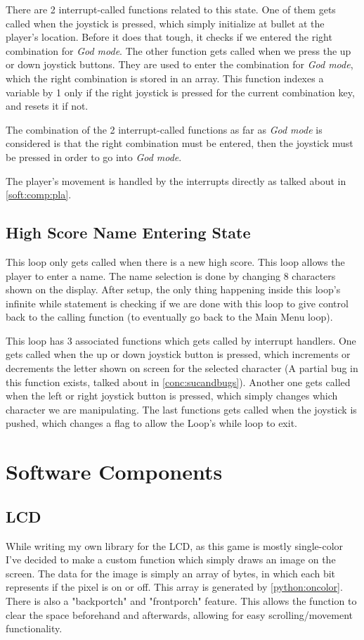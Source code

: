 \documentclass[12pt, a4paper]{article}
\begin{document}
    There are 2 interrupt-called functions related to this state. One of them gets called when the joystick is pressed, which simply initialize at bullet at the player's location. Before it does that tough, it checks if we entered the right combination for \textit{God mode}. The other function gets called when we press the up or down joystick buttons. They are used to enter the combination for \textit{God mode}, which the right combination is stored in an array. This function indexes a variable by 1 only if the right joystick is pressed for the current combination key, and resets it if not. 
    
    The combination of the 2 interrupt-called functions as far as \textit{God mode} is considered is that the right combination must be entered, then the joystick must be pressed in order to go into \textit{God mode}.
    
    The player's movement is handled by the interrupts directly as talked about in \cref{soft:comp:pla}.
    
    
    \subsection{High Score Name Entering State} \label{subsec:loop:score}
    This loop only gets called when there is a new high score. This loop allows the player to enter a name. The name selection is done by changing 8 characters shown on the display. After setup, the only thing happening inside this loop's infinite while statement is checking if we are done with this loop to give control back to the calling function (to eventually go back to the Main Menu loop). 
    
    This loop has 3 associated functions which gets called by interrupt handlers. One gets called when the up or down joystick button is pressed, which increments or decrements the letter shown on screen for the selected character (A partial bug in this function exists, talked about in \cref{conc:sucandbugs}). Another one gets called when the left or right joystick button is pressed, which simply changes which character we are manipulating. The last functions gets called when the joystick is pushed, which changes a flag to allow the Loop's while loop to exit.
    
    \section{Software Components}
    \subsection{LCD}\label{soft:comp:lcd}
    While writing my own library for the LCD, as this game is mostly single-color I've decided to make a custom function which simply draws an image on the screen. The data for the image is simply an array of bytes, in which each bit represents if the pixel is on or off. This array is generated by \cref{python:oncolor}. There is also a "backportch" and "frontporch" feature. This allows the function to clear the space beforehand and afterwards, allowing for easy scrolling/movement functionality. 
    
\end{document}
